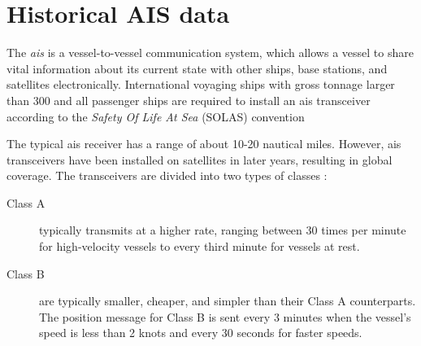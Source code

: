 \chapter{Historical AIS data}\label{chap:ais}

The \textit{\acrfull{ais}} is a vessel-to-vessel communication system, which allows a vessel to share vital information about its current state with other ships, base stations, and satellites electronically. International voyaging ships with gross tonnage larger than 300 and all passenger ships are required to install an \acrshort{ais} transceiver according to the \textit{Safety Of Life At Sea} (SOLAS) convention \cite{ais_wiki}

The typical \acrshort{ais} receiver has a range of about 10-20 nautical miles. However, \acrshort{ais} transceivers have been installed on satellites in later years, resulting in global coverage. The transceivers are divided into two types of classes \cite{ais_wiki}:
\begin{description}
    \item[Class A] typically transmits at a higher rate, ranging between 30 times per minute for high-velocity vessels to every third minute for vessels at rest. 
    \item[Class B] are typically smaller, cheaper, and simpler than their Class A counterparts. The position message for Class B is sent every 3 minutes when the vessel's speed is less than 2 knots and every 30 seconds for faster speeds. 
\end{description}

